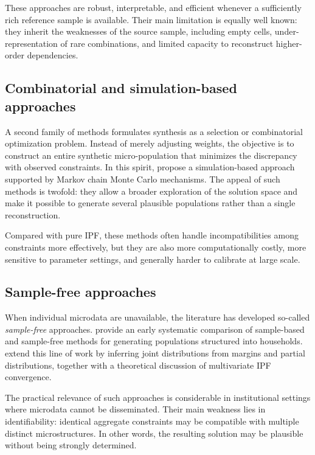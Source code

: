 \documentclass[11pt,a4paper]{article}
\begin{document}
These approaches are robust, interpretable, and efficient whenever a sufficiently rich reference sample is available. Their main limitation is equally well known: they inherit the weaknesses of the source sample, including empty cells, under-representation of rare combinations, and limited capacity to reconstruct higher-order dependencies.

\subsection{Combinatorial and simulation-based approaches}
A second family of methods formulates synthesis as a selection or combinatorial optimization problem. Instead of merely adjusting weights, the objective is to construct an entire synthetic micro-population that minimizes the discrepancy with observed constraints. In this spirit, \citet{farooq2013} propose a simulation-based approach supported by Markov chain Monte Carlo mechanisms. The appeal of such methods is twofold: they allow a broader exploration of the solution space and make it possible to generate several plausible populations rather than a single reconstruction.

Compared with pure IPF, these methods often handle incompatibilities among constraints more effectively, but they are also more computationally costly, more sensitive to parameter settings, and generally harder to calibrate at large scale.

\subsection{Sample-free approaches}
When individual microdata are unavailable, the literature has developed so-called \emph{sample-free} approaches. \citet{lenormand2012} provide an early systematic comparison of sample-based and sample-free methods for generating populations structured into households. \citet{ye2017} extend this line of work by inferring joint distributions from margins and partial distributions, together with a theoretical discussion of multivariate IPF convergence.

The practical relevance of such approaches is considerable in institutional settings where microdata cannot be disseminated. Their main weakness lies in identifiability: identical aggregate constraints may be compatible with multiple distinct microstructures. In other words, the resulting solution may be plausible without being strongly determined.
\end{document}
